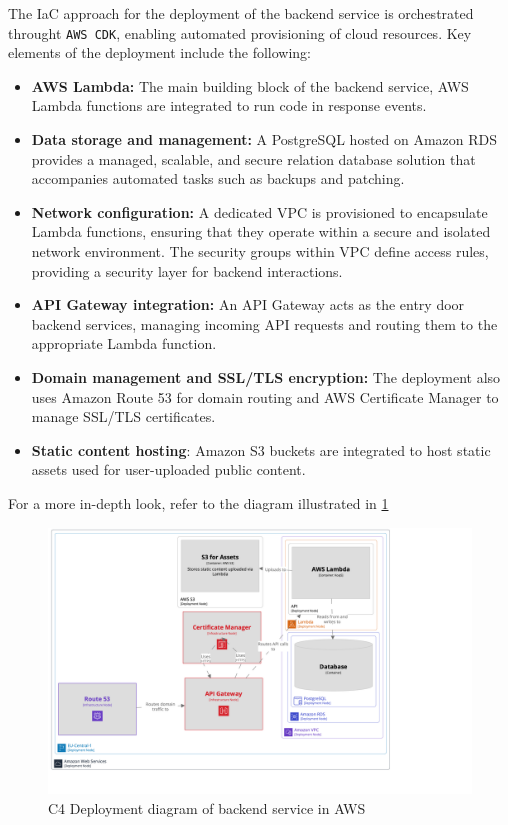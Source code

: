 The \ac{IaC} approach for the deployment of the backend service is orchestrated throught \texttt{AWS CDK}, enabling automated provisioning of cloud resources.
Key elements of the deployment include the following:
\begin{itemize}
    \item \textbf{AWS Lambda:} The main building block of the backend service, AWS Lambda functions are integrated to run code in response events.
    \item \textbf{Data storage and management:} A PostgreSQL hosted on Amazon \ac{RDS} provides a managed, scalable, and secure relation database solution that accompanies automated tasks such as backups and patching.
    \item \textbf{Network configuration:} A dedicated \ac{VPC} is provisioned to encapsulate Lambda functions, ensuring that they operate within a secure and isolated network environment. The security groups within \ac{ VPC} define access rules, providing a security layer for backend interactions.
    \item \textbf{API Gateway integration:} An API Gateway acts as the entry door backend services, managing incoming API requests and routing them to the appropriate Lambda function.
    \item \textbf{Domain management and SSL/TLS encryption:} The deployment also uses Amazon Route 53 for domain routing and \ac{AWS} Certificate Manager to manage SSL/TLS certificates. 
    \item \textbf{Static content hosting}: Amazon \ac{S3} buckets are integrated to host static assets used for user-uploaded public content.
\end{itemize}

For a more in-depth look, refer to the diagram illustrated in \ref{img06:fig_lambda}

\begin{figure}[p]\centering
\includegraphics[width=140mm]{img/chap06/fig_lambda.png}
\caption{C4 Deployment diagram of backend service in AWS}
\label{img06:fig_lambda}
\end{figure}


